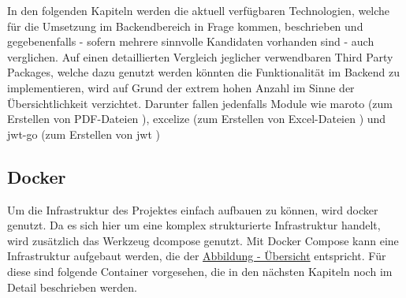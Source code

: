 	\newpage
	In den folgenden Kapiteln werden die aktuell verfügbaren Technologien, welche für die Umsetzung im Backendbereich in Frage kommen, beschrieben und gegebenenfalls - sofern mehrere sinnvolle Kandidaten vorhanden sind - auch verglichen. Auf einen detaillierten Vergleich jeglicher verwendbaren Third Party Packages, welche dazu genutzt werden könnten die Funktionalität im Backend zu implementieren, wird auf Grund der extrem hohen Anzahl im Sinne der Übersichtlichkeit verzichtet. Darunter fallen jedenfalls Module wie maroto (zum Erstellen von PDF-Dateien \cite{maroto}), excelize (zum Erstellen von Excel-Dateien \cite{excelize}) und jwt-go (zum Erstellen von \Gls{jwt} \cite{jwt-go}) 
	\subsection{Docker}
	Um die Infrastruktur des Projektes einfach aufbauen zu können, wird \Gls{docker} genutzt. Da es sich hier um eine komplex strukturierte Infrastruktur handelt, wird zusätzlich das Werkzeug \Gls{dcompose} genutzt. Mit Docker Compose kann eine Infrastruktur aufgebaut werden, die der \hyperref[fig:uebersicht]{Abbildung - Übersicht} entspricht. Für diese sind folgende Container vorgesehen, die in den nächsten Kapiteln noch im Detail beschrieben werden.

